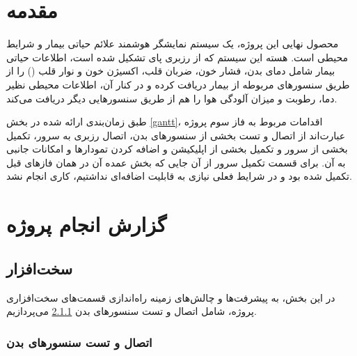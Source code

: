 \documentclass[12pt]{article}
\begin{document}
\newpage
\pagestyle{fancy}
\fancyhf{}
\fancyfoot{}
\cfoot{\thepage}
\chead{}

\newfontfamily{}

\KashidaOff
 \newcommand{\inlineLatin}[1]{
	\small{\lr{{\terminal #1}}}
}


\tableofcontents
\listoffigures

\newpage
\section{مقدمه}


محصول نهایی این پروژه، یک سیستم نمایشگر هوشمند علائم حیاتی بیمار و شرایط محیطی است. هسته این سیستم که از رزبری پای تشکیل شده است، اطلاعات حیاتی بیمار شامل دمای بدن، فشار خون، ضربان قلب، اکسیژن خون و نوار قلب () را از طریق سنسور‌های مربوطه از بیمار دریافت کرده و در کنار آن، اطلاعات محیطی نظیر دما،‌ رطوبت و میزان آلودگی هوا را هم از طریق سنسورهایی دیگر دریافت می‌کند.

طبق زمان‌بندی ارائه شده در بخش \ref{gantt}، اقدامات مربوط به فاز سوم پروژه عبارت‌اند از اتصال و تست بخشی از سنسورهای بدن، اتصال رزبری به سرور، تکمیل بخشی از سرور و تکمیل بخشی از اپلیکیشن و اضافه کردن تمودارها و امکانات جانبی به آن. برای قسمت تکمیل سرور از آن جایی که بخش عمده آن در همان فازهای قبل تکمیل شده بود و در شرایط فعلی نیازی به قابلیت اضافه‌ای نداشتیم،‌ کار‌ی انجام نشد.




\section{گزارش انجام پروژه}
\subsection{سخت‌افزار}

در این بخش، به پیشرفت‌ها و چالش‌های زمینه راه‌اندازی قسمت‌های سخت‌افزاری پروژه، شامل اتصال و تست سنسورهای بدن \ref{body} می‌پردازیم.

\subsubsection{اتصال و تست سنسورهای بدن} \label{body}
\end{document}
